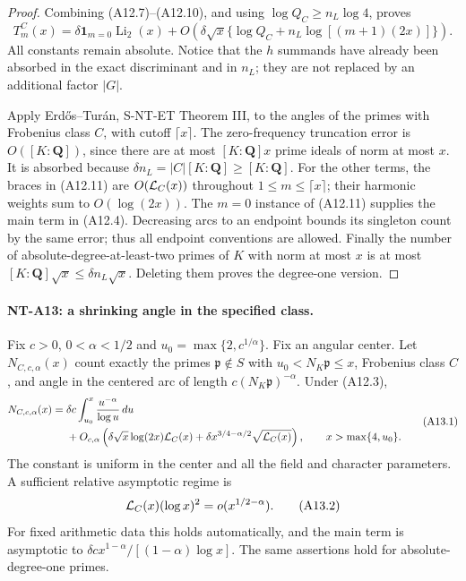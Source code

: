 \begin{proof}
Combining (A12.7)--(A12.10), and using
\(\log Q_C\ge n_L\log4\), proves
\[
 T_m^C(x)=\delta\mathbf1_{m=0}\operatorname{Li}_2(x)
     +O\left(\delta\sqrt x
        \{\log Q_C+n_L\log[(m+1)(2x)]\}\right).
                                                               \tag{A12.11}
\]
All constants remain absolute. Notice that the \(h\)
summands have already been absorbed in the exact
discriminant and in \(n_L\); they are not replaced by
an additional factor \(|G|\).

Apply Erd\H{o}s--Tur\'an, S-NT-ET Theorem III, to the angles
of the primes with Frobenius class \(C\), with cutoff
\(\lceil x\rceil\). The zero-frequency truncation error
is \(O([K:\mathbf Q])\), since there are at most
\([K:\mathbf Q]x\) prime ideals of norm at most \(x\).
It is absorbed because
\(\delta n_L=|C|[K:\mathbf Q]\ge[K:\mathbf Q]\).
For the other terms, the braces in (A12.11) are
\(O({\cal L}_C(x))\) throughout \(1\le m\le\lceil x\rceil\);
their harmonic weights sum to \(O(\log(2x))\).
The \(m=0\) instance of (A12.11) supplies the main term
in (A12.4). Decreasing arcs to an endpoint bounds its
singleton count by the same error; thus all endpoint
conventions are allowed.
Finally the number of absolute-degree-at-least-two primes
of \(K\) with norm at most \(x\) is at most
\([K:\mathbf Q]\sqrt x\le\delta n_L\sqrt x\).
Deleting them proves the degree-one version.
\end{proof}

\paragraph{NT-A13: a shrinking angle in the specified class.}
Fix \(c>0\), \(0<\alpha<1/2\) and
\(u_0=\max\{2,c^{1/\alpha}\}\). Fix an angular center.
Let \(N_{C,c,\alpha}(x)\) count exactly the primes
\(\mathfrak p\notin S\) with \(u_0<N_K\mathfrak p\le x\),
Frobenius class \(C\), and angle in the centered arc
of length \(c(N_K\mathfrak p)^{-\alpha}\). Under (A12.3),
\[
 \begin{split}
 N_{C,c,\alpha}(x)
   ={}&\delta c\int_{u_0}^x\frac{u^{-\alpha}}{\log u}\,du\\
     &+O_{c,\alpha}\left(
       \delta\sqrt x\log(2x){\cal L}_C(x)
       +\delta x^{3/4-\alpha/2}\sqrt{{\cal L}_C(x)}
                     \right),\qquad x>\max\{4,u_0\}.
 \end{split}                                                   \tag{A13.1}
\]
The constant is uniform in the center and all the field and
character parameters. A sufficient relative asymptotic regime is
\[
         {\cal L}_C(x)(\log x)^2=o(x^{1/2-\alpha}).
                                                               \tag{A13.2}
\]
For fixed arithmetic data this holds automatically, and the
main term is asymptotic to
\(\delta c x^{1-\alpha}/[(1-\alpha)\log x]\).
The same assertions hold for absolute-degree-one primes.

